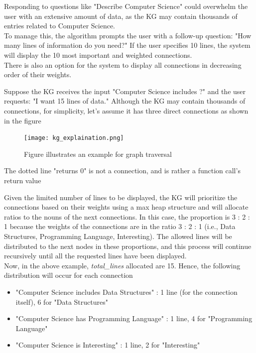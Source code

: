 \documentclass[conference]{IEEEtran}
\begin{document}
Responding to questions like "Describe Computer Science" could overwhelm the user with an extensive amount of data, as the KG may contain thousands of entries related to Computer Science. \\
To manage this, the algorithm prompts the user with a follow-up question: "How many lines of information do you need?" If the user specifies 10 lines, the system will display the 10 most important and weighted connections. 
\\
There is also an option for the system to display all connections in decreasing order of their weights.


Suppose the KG receives the input "Computer Science includes ?" and the user requests: "I want 15 lines of data."
Although the KG may contain thousands of connections, for simplicity, let's assume it has three direct connections as shown in the figure

\begin{figure}[htbp]
\centering
\texttt{[image: kg\_explaination.png]}
\caption{Figure illustrates an example for graph traversal}
\label{fig}
\end{figure}

The dotted line "returns 0" is not a connection, and is rather a function call's return value



Given the limited number of lines to be displayed, the KG will prioritize the connections based on their weights using a max heap structure and will allocate ratios to the nouns of the next connections. In this case, the proportion is 3 : 2 : 1 
because the weights of the connections are in the ratio 3 : 2 : 1 (i.e., Data Structures, Programming Language, Interesting). The allowed lines will be distributed to the next nodes in these proportions, and this process will continue recursively until all the requested lines have been displayed.\\


Now, in the above example, \textit{total\_lines} allocated are 15. Hence, the following distribution will occur for each connection
\begin{itemize}
\item "Computer Science includes Data Structures" : 1 line (for the connection itself), 6 for "Data Structures"
\item "Computer Science has Programming Language" : 1 line, 4 for "Programming Language"
\item "Computer Science is Interesting" : 1 line, 2 for "Interesting"
\end{itemize}
\end{document}
